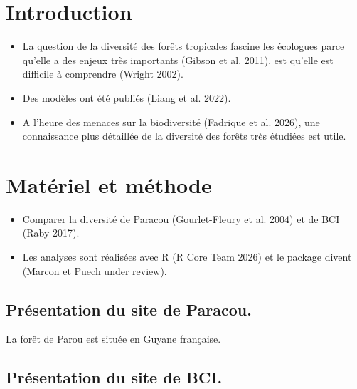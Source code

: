 \documentclass[
  french,
  11pt,
]{stylisharticle}
\affiliation{%
      \textsuperscript{1}%
      AgroParisTech Montpellier%
      , Master 2 BioGET%
      , Somewhere%
      , Montpellier%
      , France%
      , 34000%
    }
\providecommand{\tightlist}{%
  \setlength{\itemsep}{0pt}\setlength{\parskip}{0pt}}
\begin{document}
\flushbottom

\maketitle

\tableofcontents

\thispagestyle{empty}

\section{Introduction}\label{introduction}

\begin{itemize}
\tightlist
\item
  La question de la diversité des forêts tropicales fascine les
  écologues parce qu'elle a des enjeux très importants ({Gibson et al.}
  2011). est qu'elle est difficile à comprendre (Wright 2002).
\item
  Des modèles ont été publiés ({Liang et al.} 2022).
\item
  A l'heure des menaces sur la biodiversité ({Fadrique et al.} 2026),
  une connaissance plus détaillée de la diversité des forêts très
  étudiées est utile.
\end{itemize}

\section{Matériel et méthode}\label{matuxe9riel-et-muxe9thode}

\begin{itemize}
\tightlist
\item
  Comparer la diversité de Paracou (Gourlet-Fleury et al. 2004) et de
  BCI (Raby 2017).
\item
  Les analyses sont réalisées avec R (R Core Team 2026) et le package
  divent (Marcon et Puech under review).
\end{itemize}

\subsection{Présentation du site de
Paracou.}\label{pruxe9sentation-du-site-de-paracou.}

La forêt de Parou est située en Guyane française.

\subsection{Présentation du site de
BCI.}\label{pruxe9sentation-du-site-de-bci.}
\end{document}
